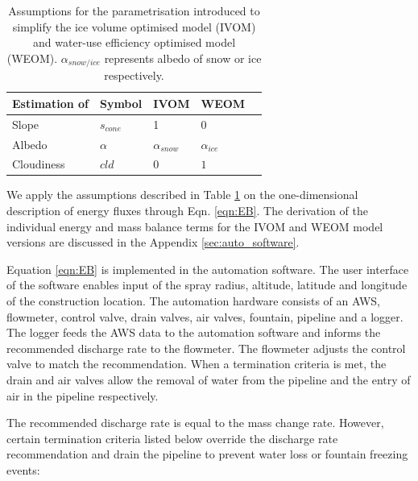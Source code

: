 \begin{table}[htb]
\centering
\caption{Assumptions for the parametrisation introduced to simplify the ice volume optimised model (IVOM) and
water-use efficiency optimised model (WEOM). $\alpha_{snow/ice}$ represents albedo of snow or ice respectively.}
\label{tab:assumptions}
\begin{tabular}{|lllll|}
\toprule
\textbf{Estimation of} & \textbf{Symbol} & \textbf{IVOM} & \textbf{WEOM} & \\\midrule
\multicolumn{1}{|l}{Slope}        & $s_{cone}$ & 1 & 0 & \multicolumn{1}{l|}{} \\ 
\multicolumn{1}{|l}{Albedo} & $\alpha$ & $\alpha_{snow}$ & $\alpha_{ice}$ & \multicolumn{1}{l|}{} \\
\multicolumn{1}{|l}{Cloudiness}  & $cld$ & $0$ & $1$ & \multicolumn{1}{l|}{} \\\bottomrule 
\end{tabular}
\end{table}

We apply the assumptions described in Table \ref{tab:assumptions} on the one-dimensional description of energy
fluxes through Eqn. \ref{eqn:EB}. The derivation of the individual energy and mass balance terms for the
\ac{IVOM} and \ac{WEOM} model versions are discussed in the Appendix \ref{sec:auto_software}.

Equation \ref{eqn:EB} is implemented in the automation software. The user interface of the software enables
input of the spray radius, altitude, latitude and longitude of the construction location. The automation
hardware consists of an AWS, flowmeter, control valve, drain valves, air valves, fountain, pipeline and a
logger. The logger feeds the AWS data to the automation software and informs the recommended discharge rate to
the flowmeter. The flowmeter adjusts the control valve to match the recommendation. When a termination
criteria is met, the drain and air valves allow the removal of water from the pipeline and the entry of
air in the pipeline respectively.

The recommended discharge rate is equal to the mass change rate. However, certain termination criteria listed
below override the discharge rate recommendation and drain the pipeline to prevent water loss or fountain
freezing events:

